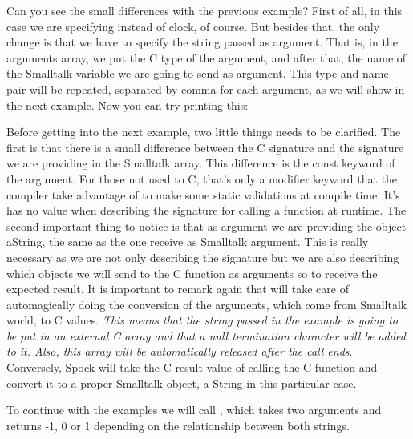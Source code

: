 \documentclass[a4paper,10pt,twoside]{book}
\begin{document}
Can you see the small differences with the previous example? 
First of all, in this case we are specifying 
instead of clock, of course. But besides that, the only
change is that we have to specify the string passed
as argument. That is, in the arguments array, we
put the C type of the argument, and after that,
the name of the Smalltalk variable we are going to send as 
argument. This type-and-name pair will be repeated, separated 
by comma for each argument, as we will show in the next
example. Now you can try printing this:


Before getting into the next example, two little things
needs to be clarified. The first is that there is a small
difference between the C signature and the signature we are
providing in the Smalltalk array. This difference is 
the const keyword of the argument. For those not used to C, 
that's only a modifier keyword that the compiler take advantage
of to make some static validations at compile time. It's has no
value when describing the signature for calling a function at
runtime.
The second important thing to notice is that as argument we are providing
the object {\sffamily aString}, the same as the one receive as Smalltalk argument.
This is really necessary as we are not only describing the signature
but we are also describing which objects we will send to the C 
function as arguments so to receive the expected result.
It is important to remark again that \Spock will take care of automagically
doing the conversion of the arguments, which come from Smalltalk
world, to C values. \emph{This means
that the string passed in the example is going to be put in an
external C  array and that a null termination character will be
added to it. Also, this array will be automatically released 
after the call ends}. Conversely, Spock will take the C result
value of calling the C function and convert it to a proper Smalltalk
object, a String in this particular case.



To continue with the examples we will call , which takes two arguments and returns -1, 0 or 1 depending on the relationship between both strings.
\end{document}

